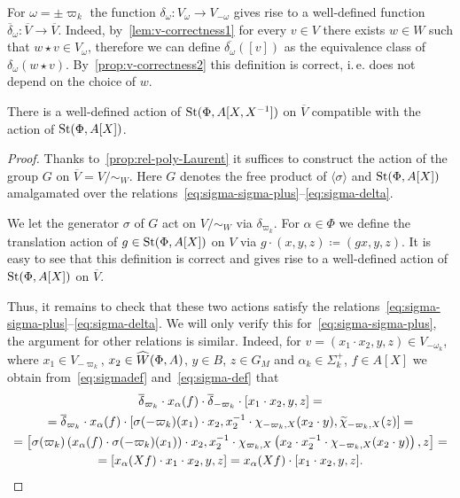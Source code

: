 \begin{cor}
For $\omega = \pm \varpi_k$ the function $\delta_\omega \colon V_{\omega} \to V_{-\omega}$ gives rise to a well-defined function $\overline{\delta}_\omega \colon \overline{V} \to \overline{V}.$
Indeed, by~\cref{lem:v-correctness1} for every $v \in V$ there exists $w \in W$ such that $w \star v \in V_\omega$, therefore
we can define $\overline{\delta_\omega}([v])$ as the equivalence class of $\delta_{\omega}(w \star v)$.
By~\cref{prop:v-correctness2} this definition is correct, i.\,e. does not depend on the choice of $w$.

\begin{prop}
    There is a well-defined action of $\operatorname{St}(\Phi, A[X, X^{-1}])$ on $\overline{V}$ compatible with the action of $\operatorname{St}(\Phi, A[X])$.
\end{prop}
\begin{proof}
    Thanks to~\cref{prop:rel-poly-Laurent} it suffices to construct the action of the group $G$ on $\overline{V} = V/\sim_W$.
    Here $G$ denotes the free product of $\langle \sigma \rangle$ and $\operatorname{St}(\Phi, A[X])$ amalgamated over the relations~\eqref{eq:sigma-sigma-plus}--\eqref{eq:sigma-delta}.

    We let the generator $\sigma$ of $G$ act on $V/\sim_W$ via $\delta_{\varpi_k}$.
    For $\alpha \in \Phi$ we define the translation action of $g \in \operatorname{St}(\Phi, A[X])$ on $V$ via $g \cdot (x, y, z) \coloneqq (gx, y, z)$.
    It is easy to see that this definition is correct and gives rise to a well-defined action of $\operatorname{St}(\Phi, A[X])$ on $\overline{V}$.

    Thus, it remains to check that these two actions satisfy the relations~\eqref{eq:sigma-sigma-plus}--\eqref{eq:sigma-delta}.
    We will only verify this for~\eqref{eq:sigma-sigma-plus}, the argument for other relations is similar.
    Indeed, for $v = (x_1 \cdot x_2, y, z) \in V_{-\omega_k}$, where $x_1 \in V_{-\varpi_k}$, $x_2 \in \widehat{W}(\Phi, A)$, $y \in B$, $z \in G_M$ and $\alpha_k \in \Sigma_k^+$, $f \in A[X]$
     we obtain from~\eqref{eq:sigmadef} and~\eqref{eq:sigma-def} that
    \begin{multline*}
        \overline{\delta}_{\varpi_k} \cdot x_\alpha(f) \cdot \overline{\delta}_{-\varpi_k} \cdot [x_1 \cdot x_2, y, z] = \\
        = \overline{\delta}_{\varpi_k} \cdot x_\alpha(f) \cdot [\sigma(-\varpi_k)(x_1) \cdot x_2, x_2^{-1} \cdot \chi_{-\varpi_k, X}(x_2 \cdot y), \widetilde{\chi}_{-\varpi_k, X}(z)] = \\
        = \left[\sigma(\varpi_k)\left(x_{\alpha}(f) \cdot \sigma(-\varpi_k)(x_1)\right) \cdot x_2, x_2^{-1} \cdot \chi_{\varpi_k, X}\left(x_2 \cdot x_2^{-1} \cdot \chi_{-\varpi_k, X}(x_2 \cdot y)\right), z\right] = \\
        = [x_\alpha(Xf) \cdot x_1 \cdot x_2, y, z] = x_\alpha(Xf) \cdot [x_1 \cdot x_2, y, z]. \qedhere
    \end{multline*}
\end{proof}


\end{cor}
